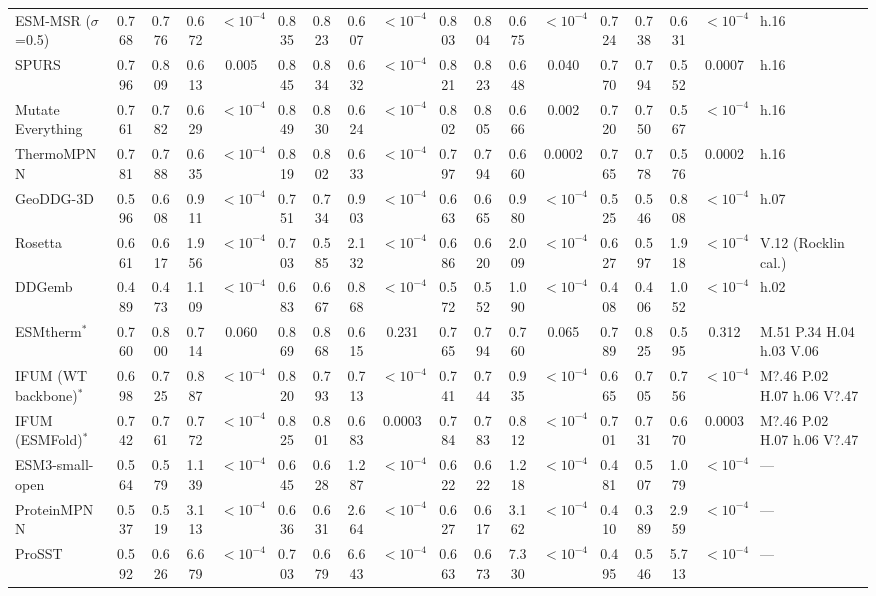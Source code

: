 \begin{table}[H]
{\begin{tabular}{lccccccccccccccccl}
ESM-MSR ($\sigma$=0.5) & 0.768 & 0.776 & 0.672 & $<10^{-4}$ & 0.835 & 0.823 & 0.607 & $<10^{-4}$ & 0.803 & 0.804 & 0.675 & $<10^{-4}$ & 0.724 & 0.738 & 0.631 & $<10^{-4}$ & h.16 \\
SPURS & 0.796 & 0.809 & 0.613 & 0.005 & 0.845 & 0.834 & 0.632 & $<10^{-4}$ & 0.821 & 0.823 & 0.648 & 0.040 & 0.770 & 0.794 & 0.552 & 0.0007 & h.16 \\
Mutate Everything & 0.761 & 0.782 & 0.629 & $<10^{-4}$ & 0.849 & 0.830 & 0.624 & $<10^{-4}$ & 0.802 & 0.805 & 0.666 & 0.002 & 0.720 & 0.750 & 0.567 & $<10^{-4}$ & h.16 \\
ThermoMPNN & 0.781 & 0.788 & 0.635 & $<10^{-4}$ & 0.819 & 0.802 & 0.633 & $<10^{-4}$ & 0.797 & 0.794 & 0.660 & 0.0002 & 0.765 & 0.778 & 0.576 & 0.0002 & h.16 \\
GeoDDG-3D & 0.596 & 0.608 & 0.911 & $<10^{-4}$ & 0.751 & 0.734 & 0.903 & $<10^{-4}$ & 0.663 & 0.665 & 0.980 & $<10^{-4}$ & 0.525 & 0.546 & 0.808 & $<10^{-4}$ & h.07 \\
Rosetta & 0.661 & 0.617 & 1.956 & $<10^{-4}$ & 0.703 & 0.585 & 2.132 & $<10^{-4}$ & 0.686 & 0.620 & 2.009 & $<10^{-4}$ & 0.627 & 0.597 & 1.918 & $<10^{-4}$ & V.12 (Rocklin cal.) \\
DDGemb & 0.489 & 0.473 & 1.109 & $<10^{-4}$ & 0.683 & 0.667 & 0.868 & $<10^{-4}$ & 0.572 & 0.552 & 1.090 & $<10^{-4}$ & 0.408 & 0.406 & 1.052 & $<10^{-4}$ & h.02 \\
ESMtherm$^*$ & 0.760 & 0.800 & 0.714 & 0.060 & 0.869 & 0.868 & 0.615 & 0.231 & 0.765 & 0.794 & 0.760 & 0.065 & 0.789 & 0.825 & 0.595 & 0.312 & M.51 P.34 H.04 h.03 V.06 \\
IFUM (WT backbone)$^*$ & 0.698 & 0.725 & 0.887 & $<10^{-4}$ & 0.820 & 0.793 & 0.713 & $<10^{-4}$ & 0.741 & 0.744 & 0.935 & $<10^{-4}$ & 0.665 & 0.705 & 0.756 & $<10^{-4}$ & M?.46 P.02 H.07 h.06 V?.47 \\
IFUM (ESMFold)$^*$ & 0.742 & 0.761 & 0.772 & $<10^{-4}$ & 0.825 & 0.801 & 0.683 & 0.0003 & 0.784 & 0.783 & 0.812 & $<10^{-4}$ & 0.701 & 0.731 & 0.670 & 0.0003 & M?.46 P.02 H.07 h.06 V?.47 \\
ESM3-small-open & 0.564 & 0.579 & 1.139 & $<10^{-4}$ & 0.645 & 0.628 & 1.287 & $<10^{-4}$ & 0.622 & 0.622 & 1.218 & $<10^{-4}$ & 0.481 & 0.507 & 1.079 & $<10^{-4}$ & --- \\
ProteinMPNN & 0.537 & 0.519 & 3.113 & $<10^{-4}$ & 0.636 & 0.631 & 2.664 & $<10^{-4}$ & 0.627 & 0.617 & 3.162 & $<10^{-4}$ & 0.410 & 0.389 & 2.959 & $<10^{-4}$ & --- \\
ProSST & 0.592 & 0.626 & 6.679 & $<10^{-4}$ & 0.703 & 0.679 & 6.643 & $<10^{-4}$ & 0.663 & 0.673 & 7.330 & $<10^{-4}$ & 0.495 & 0.546 & 5.713 & $<10^{-4}$ & --- \\
\bottomrule
\end{tabular}
}
\end{table}



